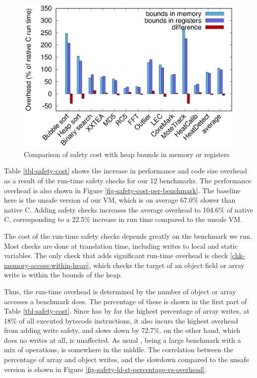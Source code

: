 \begin{figure}
\centering
\includegraphics[width=\mygraphsize]{safety-cost-diff-using-regs.eps}
\caption{Comparison of safety cost with heap bounds in memory or registers}
\label{fig-safety-cost-memory-or-registers}
\end{figure}

Table \ref{tbl-safety-cost} shows the increase in performance and code size overhead as a result of the run-time safety checks for our 12 benchmarks. The performance overhead is also shown in Figure \ref{fig-safety-cost-per-benchmark}. The baseline here is the unsafe version of our VM, which is on average 67.0\% slower than native C. Adding safety checks increases the average overhead to 104.6\% of native C, corresponding to a 22.5\% increase in run time compared to the unsafe VM.

The cost of the run-time safety checks depends greatly on the benchmark we run. Most checks are done at translation time, including writes to local and static variables. The only check that adds significant run-time overhead is check \ref{chk-memory-access-within-heap}, which checks the target of an object field or array write is within the bounds of the heap.

Thus, the run-time overhead is determined by the number of object or array accesses a benchmark does. The percentage of these is shown in the first part of Table \ref{tbl-safety-cost}. Since  has by far the highest percentage of array writes, at 18\% of all executed bytecode instructions, it also incurs the highest overhead from adding write safety, and slows down by 72.7\%.  on the other hand, which does no writes at all, is unaffected. As usual , being a large benchmark with a mix of operations, is somewhere in the middle. The correlation between the percentage of array and object writes, and the slowdown compared to the unsafe version is shown in Figure \ref{fig-safety-ld-st-percentage-vs-overhead}.

